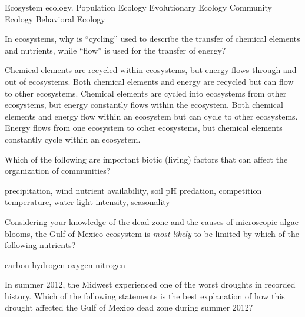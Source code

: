 \begin{choices}
\correctchoice Ecosystem ecology. %
\choice Population Ecology %
\choice Evolutionary Ecology %
\choice Community Ecology %
\choice Behavioral Ecology %
\end{choices}

\question
In ecosystems, why is ``cycling'' used to describe the transfer of chemical elements and nutrients, while ``flow'' is used for the transfer of energy?

\begin{choices}
\correctchoice Chemical elements are recycled within ecosystems, but energy flows through and out of ecosystems.%
\choice Both chemical elements and energy are recycled but can flow to other ecosystems.%
\choice Chemical elements are cycled into ecosystems from other ecosystems, but energy constantly flows within the ecosystem.%
\choice Both chemical elements and energy flow within an ecosystem but can cycle to other ecosystems.%
\choice Energy flows from one ecosystem to other ecosystems, but chemical elements constantly cycle within an ecosystem.%
\end{choices}

\question
Which of the following are important biotic (living) factors that can affect the  organization of communities?

\begin{choices}
\choice precipitation, wind%
\choice nutrient availability, soil pH%
\correctchoice predation, competition%
\choice temperature, water%
\choice light intensity, seasonality%
\end{choices}



\question
Considering your knowledge of the dead zone and the causes of microscopic algae blooms, the Gulf of Mexico ecosystem is \emph{most likely} to be limited by which of the following nutrients?

\begin{choices}
	\choice carbon%
	\choice {}%
	\choice hydrogen%
	\choice oxygen%
	\correctchoice nitrogen%
\end{choices}

\question
In summer 2012, the Midwest experienced one of the worst droughts in recorded history. Which of the following statements is the best explanation of how this drought affected the Gulf of Mexico dead zone during summer 2012?

